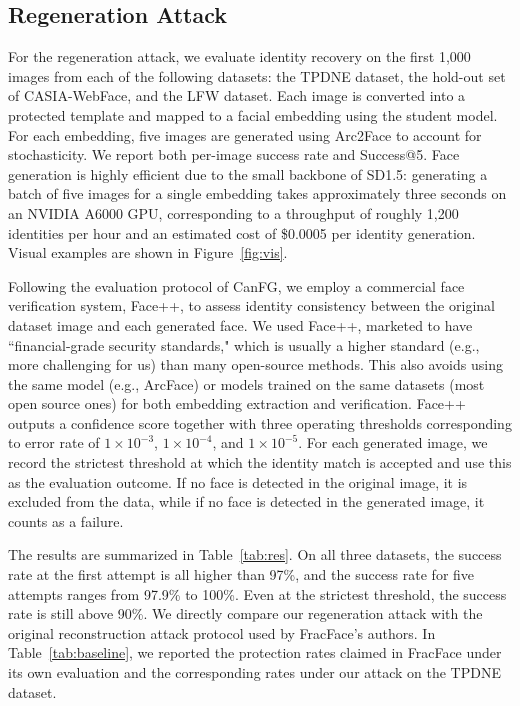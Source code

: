 \subsection{Regeneration Attack}

For the regeneration attack, we evaluate identity recovery on the first 1,000 images from each of the following datasets: the TPDNE dataset, the hold-out set of CASIA-WebFace, and the LFW dataset. Each image is converted into a protected template and mapped to a facial embedding using the student model. For each embedding, five images are generated using Arc2Face to account for stochasticity. We report both per-image success rate and Success@5. Face generation is highly efficient due to the small backbone of SD1.5: generating a batch of five images for a single embedding takes approximately three seconds on an NVIDIA A6000 GPU, corresponding to a throughput of roughly 1,200 identities per hour and an estimated cost of \$0.0005 per identity generation. Visual examples are shown in Figure~\ref{fig:vis}.



Following the evaluation protocol of CanFG, we employ a commercial face verification system, Face++, to assess identity consistency between the original dataset image and each generated face. We used Face++, marketed to have ``financial-grade security standards," which is usually a higher standard (e.g., more challenging for us) than many open-source methods. This also avoids using the same model (e.g., ArcFace) or models trained on the same datasets (most open source ones) for both embedding extraction and verification. Face++ outputs a confidence score together with three operating thresholds corresponding to error rate of $1\times10^{-3}$, $1\times10^{-4}$, and $1\times10^{-5}$. For each generated image, we record the strictest threshold at which the identity match is accepted and use this as the evaluation outcome. If no face is detected in the original image, it is excluded from the data, while if no face is detected in the generated image, it counts as a failure. 

The results are summarized in Table~\ref{tab:res}. On all three datasets, the success rate at the first attempt is all higher than 97\%, and the success rate for five attempts ranges from 97.9\% to 100\%. Even at the strictest threshold, the success rate is still above 90\%.  We directly compare our regeneration attack with the original reconstruction attack protocol used by FracFace's authors. In Table~\ref{tab:baseline}, we reported the protection rates claimed in FracFace under its own evaluation and the corresponding rates under our attack on the TPDNE dataset.

